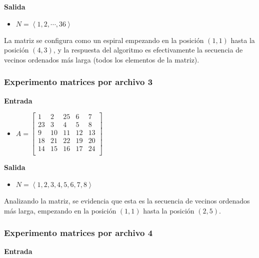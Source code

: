 \documentclass[letter]{article}
\begin{document}
\textbf{Salida} \par

\begin{itemize}
    \item $N = \left< 1, 2, \cdots, 36 \right>$
\end{itemize}

La matriz se configura como un espiral empezando en la posición $(1,1)$ hasta la posición $(4,3)$, y la respuesta del algoritmo es efectivamente la secuencia de vecinos ordenados más larga (todos los elementos de la matriz). \par

\subsubsection{Experimento matrices por archivo 3}

\textbf{Entrada} \par

\begin{itemize}
    \item $ A = 
        \begin{bmatrix}
         1 &  2 & 25 &  6 &  7 \\
        23 &  3 &  4 &  5 &  8 \\
         9 & 10 & 11 & 12 & 13 \\
        18 & 21 & 22 & 19 & 20 \\
        14 & 15 & 16 & 17 & 24 \\
        \end{bmatrix}
    $
\end{itemize}

\textbf{Salida} \par

\begin{itemize}
    \item $N = \left< 1, 2, 3, 4, 5, 6, 7, 8 \right>$
\end{itemize}

Analizando la matriz, se evidencia que esta es la secuencia de vecinos ordenados más larga, empezando en la posición $(1,1)$ hasta la posición $(2,5)$. \par

\subsubsection{Experimento matrices por archivo 4}

\textbf{Entrada} \par
\end{document}
